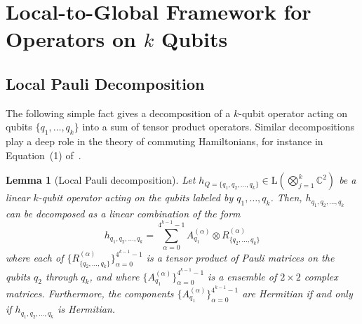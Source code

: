 \documentclass[11pt]{article}
\theoremstyle{plain}
\newtheorem{lemma}[theorem]{Lemma}
\begin{document}
\iffalse
\section{Local-to-Global Framework for Operators on $k$ Qubits}

\subsection{Local Pauli Decomposition}
The following simple fact gives a decomposition of a $k$-qubit operator acting on qubits $\{q_1, \dots, q_k\}$ into a sum of tensor product operators. Similar decompositions play a deep role in the theory of commuting Hamiltonians, for instance in Equation~(1) of~\cite{aharonov2011complexity}.

\begin{lemma}[Local Pauli decomposition]\label{algebra-fact-pauli-decomposition-k-qubits}
    Let $h_{Q = \{q_1, q_2, \dots, q_k\}} \in \mathrm{L}\left(\bigotimes\limits_{j = 1}^k \mathbb{C}^2\right)$ be a linear $k$-qubit operator acting on the qubits labeled by $q_1, \dots, q_k$. Then, $h_{q_1, q_2, \dots, q_k}$ can be decomposed as a linear combination of the form
    \begin{equation}\label{eqn:local-pauli-decomposition-k-qubits}
        h_{q_1, q_2, \dots, q_k} = \sum\limits_{\alpha = 0}^{4^{k-1} -1} A_{q_1}^{(\alpha)} \otimes R_{\{q_2, \dots, q_k\}}^{(\alpha)}
    \end{equation}
where each of $\{R_{\{q_2, \dots, q_k\}}^{(\alpha)}\}_{\alpha=0}^{4^{k-1} - 1}$ is a tensor product of Pauli matrices on the qubits $q_2$ through $q_k$, and where $\{A_{q_1}^{(\alpha)}\}_{\alpha=0}^{4^{k-1} - 1}$ is a ensemble of $2 \times 2$ complex matrices. Furthermore, the components $\{A_{q_1}^{(\alpha)}\}_{\alpha=0}^{4^{k-1} - 1}$ are Hermitian if and only if $h_{q_1, q_2, \dots, q_k}$ is Hermitian.
\end{lemma}
\end{document}
